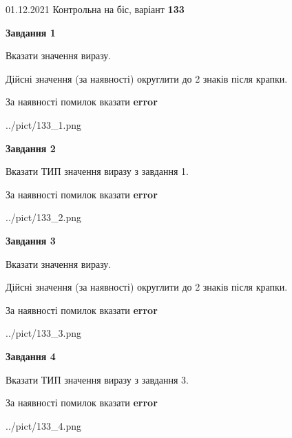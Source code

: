 \documentclass[11pt, ukrainian]{article}
\begin{document}
{01.12.2021 Контрольна на біс, варіант  \No \textbf { 133 }\par}
{
\begin {large}
{\begin {center}\textbf{Завдання 1}\end {center}}\par
Вказати значення виразу. \par
Дійсні значення (за наявності) округлити до 2 знаків після крапки. \par
За наявності помилок вказати \textbf{error}

\begin{center}
	{../pict/133_1.png}
\end{center}
\newpage

{\begin {center}\textbf{Завдання 2}\end {center}}\par
Вказати ТИП значення виразу з завдання 1. \par
За наявності помилок вказати \textbf{error}

\begin{center}
	{../pict/133_2.png}
\end{center}
\newpage

{\begin {center}\textbf{Завдання 3}\end {center}}\par
Вказати значення виразу. \par
Дійсні значення (за наявності) округлити до 2 знаків після крапки. \par
За наявності помилок вказати \textbf{error}

\begin{center}
	{../pict/133_3.png}
\end{center}
\newpage

{\begin {center}\textbf{Завдання 4}\end {center}}\par
Вказати ТИП значення виразу з завдання 3. \par
За наявності помилок вказати \textbf{error}

\begin{center}
	{../pict/133_4.png}
\end{center}
\newpage


\end{large}}
\end{document}
